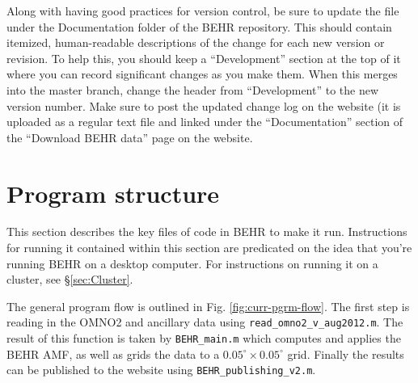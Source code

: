 \documentclass[12pt]{article}
\begin{document}
	Along with having good practices for version control, be sure to update the file  under the Documentation folder of the BEHR repository.  This should contain itemized, human-readable descriptions of the change for each new version or revision.  To help this, you should keep a ``Development'' section at the top of it where you can record significant changes as you make them.  When this merges into the master branch, change the header from ``Development'' to the new version number.  Make sure to post the updated change log on the website (it is uploaded as a regular text file and linked under the ``Documentation'' section of the ``Download BEHR data'' page on the website.

\section{Program structure}
	This section describes the key files of code in BEHR to make it run.  Instructions for running it contained within this section are predicated on the idea that you're running BEHR on a desktop computer.  For instructions on running it on a cluster, see \S\ref{sec:Cluster}.
	
	The general program flow is outlined in Fig. \ref{fig:curr-pgrm-flow}. The first step is reading in the OMNO2 and ancillary data using \lstinline$read_omno2_v_aug2012.m$. The result of this function is taken by \lstinline$BEHR_main.m$ which computes and applies the BEHR AMF, as well as grids the data to a $0.05^\circ \times 0.05^\circ$ grid. Finally the results can be published to the website using \lstinline$BEHR_publishing_v2.m$.
\end{document}
